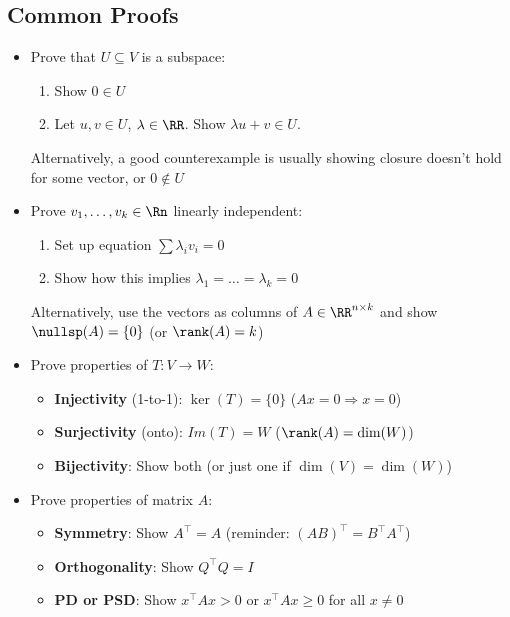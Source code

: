 \subsection{Common Proofs}
\begin{itemize}
    \item Prove that $U \subseteq V$ is a subspace:
        \begin{enumerate}
            \item Show $0 \in U$
            \item Let $u, v \in U$, $\lambda \in \RR$. Show $\lambda u + v \in U$.
        \end{enumerate}
        Alternatively, a good counterexample is usually showing
        closure doesn't hold for some vector, or $0 \notin U$
    \item Prove $v_1, \dots, v_k \in \Rn$ linearly independent:
        \begin{enumerate}
            \item Set up equation $\sum \lambda_i v_i = 0$
            \item Show how this implies $\lambda_1 = \dots = \lambda_k = 0$
        \end{enumerate}
        Alternatively, use the vectors as columns of $A \in \RR^{n \times k}$
        and show $\nullsp(A) = \{0\}$ (or $\rank(A) = k$)
    \item Prove properties of $T : V \to W$:
        \begin{itemize}
            \item \textbf{Injectivity} (1-to-1): $\ker(T) = \{0\}$ ($Ax = 0 \Rightarrow x=0$)
            \item \textbf{Surjectivity} (onto): $Im(T) = W$ ($\rank(A) = \dim(W)$)
            \item \textbf{Bijectivity}: Show both (or just one if $\dim(V) = \dim(W)$)
        \end{itemize}
    \item Prove properties of matrix $A$:
        \begin{itemize}
            \item \textbf{Symmetry}: Show $A^\top = A$ (reminder: $(AB)^\top = B^\top A^\top$)
            \item \textbf{Orthogonality}: Show $Q^\top Q = I$
            \item \textbf{PD or PSD}: Show $x^\top A x > 0$ or $x^\top Ax\ge 0$ for all $x\ne 0$
        \end{itemize}
\end{itemize}

